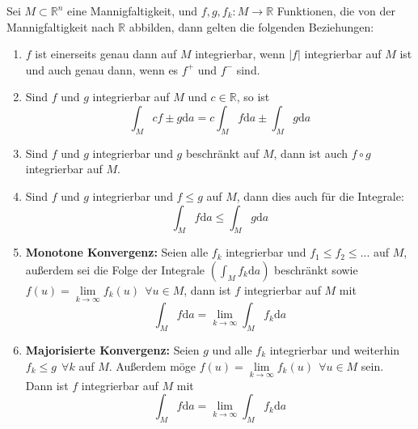 \begin{satz}
	Sei $M\subset\mathbb{R}^n$ eine Mannigfaltigkeit, und 
	$f,g,f_k:M\rightarrow\mathbb{R}$ Funktionen, die von der 
	Mannigfaltigkeit nach $\mathbb{R}$ abbilden, dann gelten die 
	folgenden Beziehungen:
	\begin{enumerate}
		\item 	$f$ ist einerseits genau dann auf $M$ integrierbar, 
				wenn $|f|$ integrierbar auf $M$ ist und auch genau dann, 
				wenn es $f^+$ und $f^-$ sind.
		\item 	Sind $f$ und $g$ integrierbar auf $M$ und $c\in\mathbb{R}$, 
				so ist
				\begin{equation*}
					\int_Mcf\pm g\mathrm{d}a = 
					c\int_Mf\mathrm{d}a\pm\int_Mg\mathrm{d}a
				\end{equation*}
		\item 	Sind $f$ und $g$ integrierbar und $g$ beschränkt auf $M$, 
				dann ist auch $f\circ g$ integrierbar auf $M$.
		\item 	Sind $f$ und $g$ integrierbar und $f\leq g$ auf $M$, 
				dann dies auch für die Integrale:
				\begin{equation*}
					\int_Mf\mathrm{d}a\leq\int_Mg\mathrm{d}a
				\end{equation*}
		\item	\textbf{Monotone Konvergenz:} Seien alle $f_k$ 
				integrierbar und $f_1\leq f_2\leq ...$ auf $M$, 
				außerdem sei die Folge der Integrale $\left(\int_Mf_k\mathrm{d}a\right)$ 
				beschränkt sowie $f(u)=\lim\limits_{k\rightarrow\infty}f_k(u) \ \ \forall u\in M$, 
				dann ist $f$ integrierbar auf $M$ mit
				\begin{equation*}
					\int_Mf\mathrm{d}a = 
					\lim\limits_{k\rightarrow\infty}\int_Mf_k\mathrm{d}a
				\end{equation*}
		\item 	\textbf{Majorisierte Konvergenz:} Seien $g$ und alle $f_k$ 
				integrierbar und weiterhin $f_k\leq g \ \ \forall k$ auf $M$. 
				Außerdem möge $f(u) = \lim\limits_{k\rightarrow\infty}f_k(u) \ \ \forall u\in M$ 
				sein. Dann ist $f$ integrierbar auf $M$ mit
				\begin{equation*}
					\int_Mf\mathrm{d}a = 
					\lim\limits_{k\rightarrow\infty}\int_Mf_k\mathrm{d}a
				\end{equation*}
	\end{enumerate}
\end{satz}